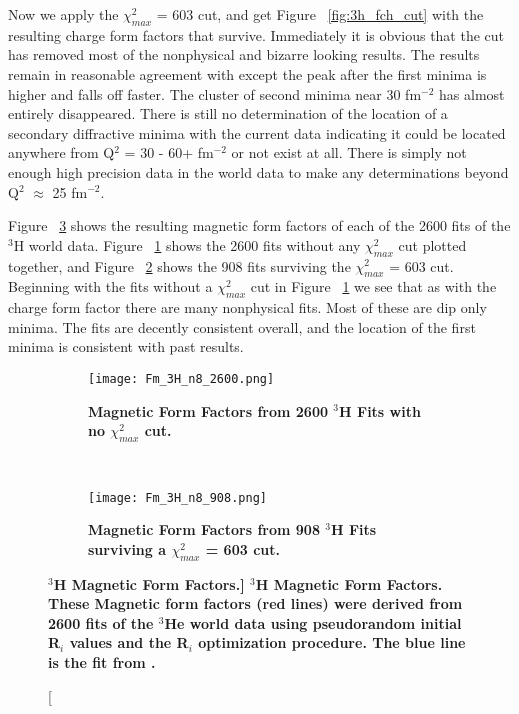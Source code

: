 Now we apply the $\chi^2_{max}$ = 603 cut, and get Figure ~\ref{fig:3h_fch_cut} with the resulting charge form factors that survive. Immediately it is obvious that the cut has removed most of the nonphysical and bizarre looking results. The results remain in reasonable agreement with \cite{Article:Amroun} except the peak after the first minima is higher and falls off faster. The cluster of second minima near 30 fm$^{-2}$ has almost entirely disappeared. There is still no determination of the location of a secondary diffractive minima with the current data indicating it could be located anywhere from  Q$^2$ = 30 - 60+ fm$^{-2}$ or not exist at all. There is simply not enough high precision data in the world data to make any determinations beyond Q$^2$ $\approx$ 25 fm$^{-2}$.

Figure ~\ref{fig:3h_fm} shows the resulting magnetic form factors of each of the 2600 fits of the $^3$H world data. Figure ~\ref{fig:3h_fm_no_cut} shows the 2600 fits without any $\chi^2_{max}$ cut plotted together, and Figure ~\ref{fig:3h_fm_cut} shows the 908 fits surviving the $\chi^2_{max}$ = 603 cut. Beginning with the fits without a $\chi^2_{max}$ cut in Figure ~\ref{fig:3h_fm_no_cut} we see that as with the charge form factor there are many nonphysical fits. Most of these are dip only minima. The fits are decently consistent overall, and the location of the first minima is consistent with past results. 

\begin{figure}[!ht]
\begin{subfigure}{1.\textwidth}
  \centering
  \texttt{[image: Fm\_3H\_n8\_2600.png]}
  \caption{\bf{Magnetic Form Factors from 2600 $^3$H Fits with no $\chi^2_{max}$ cut.}}
  \label{fig:3h_fm_no_cut}
\end{subfigure}\\
\begin{subfigure}{1.\textwidth}
  \centering
  \texttt{[image: Fm\_3H\_n8\_908.png]}
  \caption{\bf{Magnetic Form Factors from 908 $^3$H Fits surviving a $\chi^2_{max}$ = 603 cut.}}
  \label{fig:3h_fm_cut}
\end{subfigure}
\caption[\bf{$^3$H Magnetic Form Factors.}] {
{\bf{$^3$H Magnetic Form Factors.}} These Magnetic form factors (red lines) were derived from 2600 fits of the $^3$He world data using pseudorandom initial R$_i$ values and the R$_i$ optimization procedure. The blue line is the fit from \cite{Article:Amroun}.}
\label{fig:3h_fm}
\end{figure}

